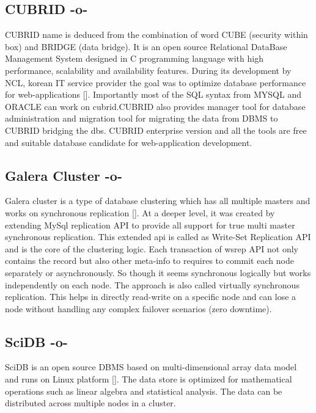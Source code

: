 \subsection{CUBRID -o-}

CUBRID name is deduced from the combination of word CUBE (security
within box) and BRIDGE (data bridge).  It is an open source Relational
DataBase Management System designed in C programming language with
high performance, scalability and availability features. During its
development by NCL, korean IT service provider the goal was to
optimize database performance for
web-applications [\cite{www-cubrid}]. Importantly most of the SQL syntax
from MYSQL and ORACLE can work on cubrid.CUBRID also provides manager
tool for database administration and migration tool for migrating the
data from DBMS to CUBRID bridging the dbs.  CUBRID enterprise version
and all the tools are free and suitable database candidate for
web-application development.



\subsection{Galera Cluster -o-}

Galera cluster is a type of database clustering which has all multiple
masters and works on synchronous
replication [\cite{www-galera-cluster}].  At a deeper level, it was
created by extending MySql replication API to provide all support for
true multi master synchronous replication.  This extended api is
called as Write-Set Replication API and is the core of the clustering
logic.  Each transaction of wsrep API not only contains the record but
also other meta-info to requires to commit each node separately or
asynchronously. So though it seems synchronous logically but works
independently on each node.  The approach is also called virtually
synchronous replication. This helps in directly read-write on a
specific node and can lose a node without handling any complex
failover scenarios (zero downtime).



\subsection{SciDB -o-}

SciDB is an open source DBMS based on multi-dimensional array data
model and runs on Linux platform [\cite{ercimnews}]. The data store is
optimized for mathematical operations such as linear algebra and
statistical analysis. The data can be distributed across multiple
nodes in a cluster.

